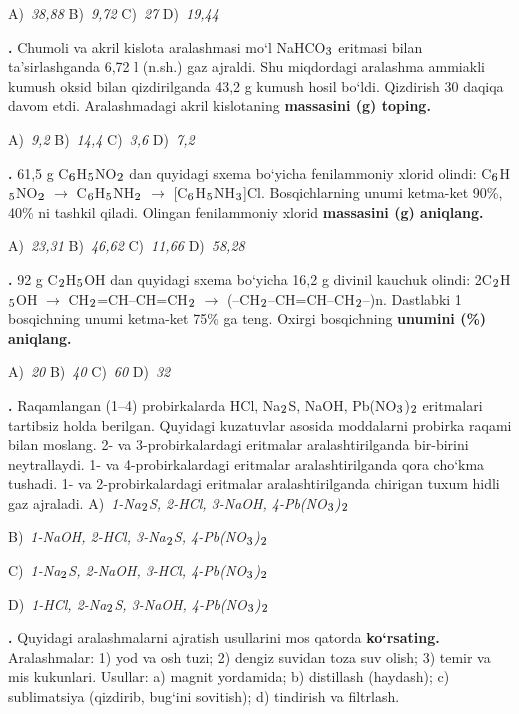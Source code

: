 \documentclass[11pt,a4paper]{article}
\renewcommand{\textsubscript}[1]{\ensuremath{_{\text{\fontsize{8}{8}\selectfont #1}}}}
\newcommand{\qn}[1]{\textbf{\fontsize{11.5}{13}\selectfont #1}}
\newcommand{\qsep}{\par\vspace{13pt}}
\begin{document}
\begin{multicols}{2}
\noindent A)~\textsl{38,88} \hfill B)~\textsl{9,72} \hfill C)~\textsl{27} \hfill D)~\textsl{19,44}\par
\qsep
\noindent\qn{27.} Chumoli va akril kislota aralashmasi mo`l NaHCO\textsubscript{3} eritmasi bilan ta'sirlashganda 6,72 l (n.sh.) gaz ajraldi. Shu miqdordagi aralashma ammiakli kumush oksid bilan qizdirilganda 43,2 g kumush hosil bo`ldi. Qizdirish 30 daqiqa davom etdi. Aralashmadagi akril kislotaning \textbf{massasini (g) toping.}

\noindent A)~\textsl{9,2} \hfill B)~\textsl{14,4} \hfill C)~\textsl{3,6} \hfill D)~\textsl{7,2}\par
\qsep
\noindent\qn{28.} 61,5 g C\textsubscript{6}H\textsubscript{5}NO\textsubscript{2} dan quyidagi sxema bo`yicha fenilammoniy xlorid olindi: C\textsubscript{6}H\textsubscript{5}NO\textsubscript{2} $\to$ C\textsubscript{6}H\textsubscript{5}NH\textsubscript{2} $\to$ [C\textsubscript{6}H\textsubscript{5}NH\textsubscript{3}]Cl. Bosqichlarning unumi ketma-ket 90\%, 40\% ni tashkil qiladi. Olingan fenilammoniy xlorid \textbf{massasini (g) aniqlang.}

\noindent A)~\textsl{23,31} \hfill B)~\textsl{46,62} \hfill C)~\textsl{11,66} \hfill D)~\textsl{58,28}\par
\qsep
\noindent\qn{29.} 92 g C\textsubscript{2}H\textsubscript{5}OH dan quyidagi sxema bo`yicha 16,2 g divinil kauchuk olindi: 2C\textsubscript{2}H\textsubscript{5}OH $\to$ CH\textsubscript{2}=CH--CH=CH\textsubscript{2} $\to$ (--CH\textsubscript{2}--CH=CH--CH\textsubscript{2}--)n. Dastlabki 1 bosqichning unumi ketma-ket 75\% ga teng. Oxirgi bosqichning \textbf{unumini (\%) aniqlang.}

\noindent A)~\textsl{20} \hfill B)~\textsl{40} \hfill C)~\textsl{60} \hfill D)~\textsl{32}\par
\qsep
\noindent\qn{30.} Raqamlangan (1--4) probirkalarda HCl, Na\textsubscript{2}S, NaOH, Pb(NO\textsubscript{3})\textsubscript{2} eritmalari tartibsiz holda berilgan. Quyidagi kuzatuvlar asosida moddalarni probirka raqami bilan moslang. 2- va 3-probirkalardagi eritmalar aralashtirilganda bir-birini neytrallaydi. 1- va 4-probirkalardagi eritmalar aralashtirilganda qora cho`kma tushadi. 1- va 2-probirkalardagi eritmalar aralashtirilganda chirigan tuxum hidli gaz ajraladi.
\noindent A)~\textsl{1-Na\textsubscript{2}S, 2-HCl, 3-NaOH, 4-Pb(NO\textsubscript{3})\textsubscript{2}}\par
\noindent B)~\textsl{1-NaOH, 2-HCl, 3-Na\textsubscript{2}S, 4-Pb(NO\textsubscript{3})\textsubscript{2}}\par
\noindent C)~\textsl{1-Na\textsubscript{2}S, 2-NaOH, 3-HCl, 4-Pb(NO\textsubscript{3})\textsubscript{2}}\par
\noindent D)~\textsl{1-HCl, 2-Na\textsubscript{2}S, 3-NaOH, 4-Pb(NO\textsubscript{3})\textsubscript{2}}\par
\qsep
\noindent\qn{31.} Quyidagi aralashmalarni ajratish usullarini mos qatorda \textbf{ko`rsating.} Aralashmalar: 1) yod va osh tuzi; 2) dengiz suvidan toza suv olish; 3) temir va mis kukunlari. Usullar: a) magnit yordamida; b) distillash (haydash); c) sublimatsiya (qizdirib, bug`ini sovitish); d) tindirish va filtrlash.


\end{multicols}
\end{document}
